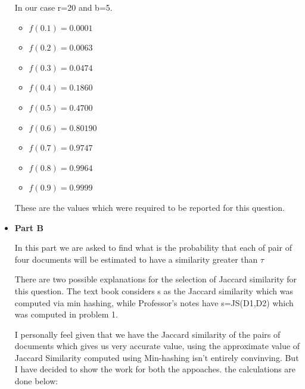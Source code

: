 \documentclass[11pt]{article}
\begin{document}
\begin{itemize}
	In our case r=20 and b=5.\\
	
	\begin{itemize}
		\item[] $f(0.1)=0.0001$
		\item[] $f(0.2)=0.0063$
		\item[] $f(0.3)=0.0474$
		\item[] $f(0.4)=0.1860$
		\item[] $f(0.5)=0.4700$
		\item[] $f(0.6)=0.80190$
		\item[] $f(0.7)=0.9747$
		\item[] $f(0.8)=0.9964$
		\item[] $f(0.9)=0.9999$
		
	\end{itemize}
	
	\begin{figure}[H]%
		\centering
		
	\end{figure}
	
	
	
	These are the values which were required to be reported for this question.	
\item[] \textbf{Part B}

In this part we are asked to find what is the probability that each of pair of four documents will be estimated to have a similarity greater than $\tau$

There are two possible explanations for the selection of Jaccard similarity for this question. The text book considers s as the Jaccard similarity which was computed via min hashing, while Professor's notes have s=JS(D1,D2) which was computed in problem 1. 

I personally feel given that we have the Jaccard similarity of the pairs of  documents which gives us very accurate value, using the approximate value of Jaccard Similarity computed using Min-hashing isn't entirely convinving. But I have decided to show the work for both the appoaches. the calculations are done below:



\end{itemize}
\end{document}
